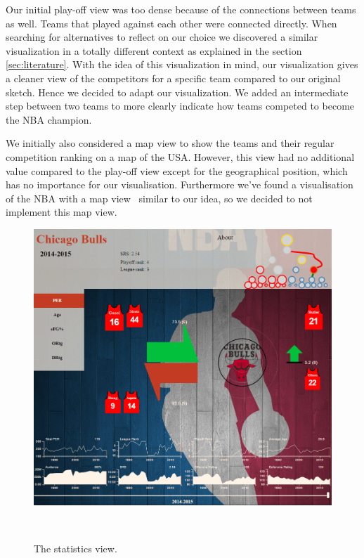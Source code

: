 \documentclass[chi_draft]{sigchi}
\begin{document}
Our initial play-off view was too dense because of the connections between teams
as well. Teams that played against each other were connected directly. When
searching for alternatives to reflect on our choice we discovered a similar
visualization in a totally different context\cite{whitehousepath} as explained in 
the section \ref{sec:literature}. With the idea of this visualization in mind, our 
visualization gives a cleaner view of the competitors for a specific team compared 
to our original sketch. Hence we decided to adapt our visualization. We added an 
intermediate step between two teams to more clearly indicate how teams competed to 
become the NBA champion. 


We initially also considered a map view to show the teams and their regular
competition ranking on a map of the USA. However, this view had no additional
value compared to the play-off view except for the geographical position, which
has no importance for our visualisation. Furthermore we've found a visualisation
of the NBA with a map view~\cite{mapviewvisualization} similar to our idea, so
we decided to not implement this map view. 

\begin{figure}
\centering
  \includegraphics[width=1.0\columnwidth]{figures/statisticsview}
  \caption{The statistics view.}~\label{fig:statisticsview}
\end{figure}
\end{document}
